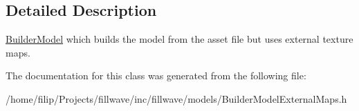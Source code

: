 \subsection{Detailed Description}
\hyperlink{classfillwave_1_1models_1_1BuilderModel}{Builder\+Model} which builds the model from the asset file but uses external texture maps. 

The documentation for this class was generated from the following file\+:\begin{DoxyCompactItemize}
\item 
/home/filip/\+Projects/fillwave/inc/fillwave/models/Builder\+Model\+External\+Maps.\+h\end{DoxyCompactItemize}
